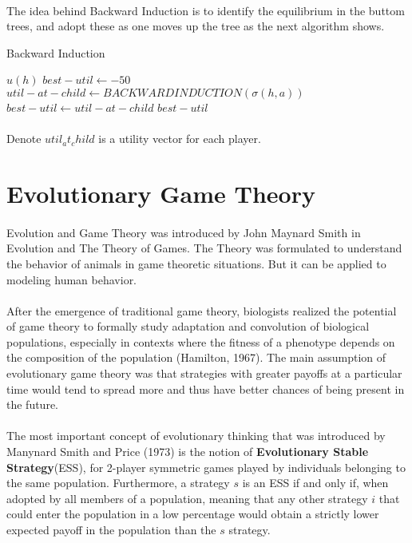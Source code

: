 \paragraph{}The idea behind Backward Induction is to identify the equilibrium in the buttom trees, and adopt these as one moves up the tree as the next algorithm shows.

\begin{algorithm}
\caption{Backward Induction\label{fig:scaled_back}}
\begin{algorithmic}
\RETURN $u(h)$
\ENDIF
\STATE $best-util \leftarrow -50$
\STATE $util-at-child \leftarrow BACKWARDINDUCTION(\sigma(h,a))$ 
\STATE $best-util \leftarrow util-at-child$
\ENDIF
\ENDFOR
\RETURN $best-util$
\end{algorithmic}
\end{algorithm}

\paragraph{} Denote $util_at_child$ is a utility vector for each player.
\section{Evolutionary Game Theory}

\paragraph{}Evolution and Game Theory was introduced by John Maynard Smith in Evolution and The Theory of Games. The Theory was formulated to understand the behavior of animals in game theoretic situations. But it can be applied to modeling human behavior.

\paragraph{}After the emergence of traditional game theory, biologists realized the potential of game theory to formally study adaptation and convolution of biological populations, especially in contexts where the fitness of a phenotype depends on the composition of the population (Hamilton, 1967). The main assumption of evolutionary game theory was that strategies with greater payoffs at a particular time would tend to spread more and thus have better chances of being present in the future.
\paragraph{}The most important concept of evolutionary thinking that was introduced by Manynard Smith and Price (1973) is the notion of \textbf{Evolutionary Stable Strategy}(ESS), for 2-player symmetric games played by individuals belonging to the same population. Furthermore, a strategy $s$ is an ESS if and only if, when adopted by all members of a population, meaning that any other strategy $i$ that could enter the population in a low percentage would obtain a strictly  lower expected payoff in the population than the $s$ strategy.
